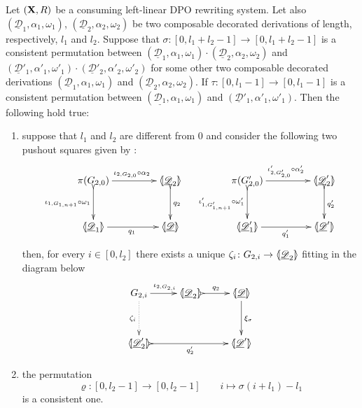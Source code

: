 \documentclass[a4paper,UKenglish,cleveref,pdftex,thm-restate,numberwithinsect,anonymous]{lipics}
\def\R{\mathsf{R}}
\def\X{\textbf {\textup{X}}}
\newcommand{\dder}[1]{\mathscr{#1}}
\newcommand{\der}[1]{\underline{\dder{#1}}}
\newcommand{\lpro}{\langle \hspace{-1.85pt}[}
\newcommand{\rpro}{]\hspace{-1.85pt}\rangle}
\newcommand{\tpro}[1]{\lpro \der{#1}\rpro}
\begin{document}
\begin{lemma}\label{lem:presuffix} Let $(\X, \R)$ be a consuming
  left-linear DPO rewriting system.  Let also
  $(\der{D}_1, \alpha_1, \omega_1)$, $(\der{D}_2, \alpha_2, \omega_2)$
  be two composable decorated derivations of length, respectively,
  $l_1$ and $l_2$. Suppose that
  $\sigma\colon [0, l_1+l_2-1]\to [0, l_1+l_2-1]$ is a consistent
  permutation between
  $(\der{D}_1, \alpha_1, \omega_1)\cdot (\der{D}_2, \alpha_2,
  \omega_2)$ and
  $(\der{D}'_1, \alpha'_1, \omega'_1)\cdot (\der{D}'_2, \alpha'_2,
  \omega'_2)$ for some other two composable decorated derivations
  $(\der{D}_1, \alpha_1, \omega_1)$ and
  $(\der{D}_2, \alpha_2, \omega_2)$.  If
  $\tau\colon [0,l_1-1]\to [0, l_1-1]$ is a consistent permutation
  between $(\der{D_1}, \alpha_1, \omega_1)$ and
  $(\der{D}'_1, \alpha'_1, \omega'_1)$. Then the following hold true:
  \begin{enumerate}
  \item suppose that $l_1$ and $l_2$ are different from $0$ and
    consider the following two pushout squares given by
    :
    \[\xymatrix@C=45pt@R=30pt{\pi(G_{2,0}) \ar@{>->}[d]_{\iota_{1,
            G_{1,n+1}} \circ \omega_1}\ar[r]^{\iota_{2, G_{2,0}} \circ
          \alpha_2}& \lpro \der{D}_2 \rpro \ar@{>->}[d]^{q_2} &
        \pi(G'_{2,0}) \ar@{>->}[d]_{\iota'_{1, G'_{1,n+1}} \circ
          \omega'_1} \ar[r]^{\iota'_{2, G'_{2,0}} \circ \alpha'_2}&
        \lpro \der{D}'_2 \rpro \ar@{>->}[d]^{q'_2} \\ \lpro \der{D}_1
        \rpro \ar[r]_{q_1} & \tpro{D} & \lpro \der{D}'_1\rpro
        \ar[r]_{q'_1} & \lpro \der{D}'\rpro }\] then, for every
    $i\in [0, l_2]$ there exists a unique
    $\zeta_i\colon G_{2,i}\to \lpro \der{D}_2\rpro $ fitting in the
    diagram below
    \[\xymatrix@R=35pt{G_{2,i} \ar[r]^{\iota_{2,G_{2,i}}} \ar@{.>}[d]_{\zeta_i}&\lpro \der{D}_2 \rpro \ar@{>->}[r]^{q_2}& \tpro{D} \ar[d]^{\xi_{\sigma}} \\
        \lpro \der{D}'_2 \rpro \ar@{>->}[rr]_{q'_2}&& \lpro
        \der{D}'\rpro }\]
  \item the permutation
    \[\varrho\colon [0,l_2-1]\to [0, l_2-1] \qquad i \mapsto
      \sigma(i+l_1)-l_1\] is a consistent one.
  \end{enumerate}
\end{lemma}
\end{document}
